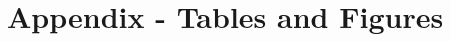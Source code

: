 \documentclass[11pt]{article}
\begin{document}
\section{Appendix - Tables and Figures}
\end{document}
